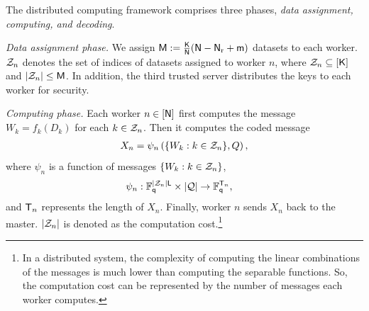 \documentclass[conference,letterpaper]{IEEEtran}
\begin{document}
The distributed computing framework comprises three phases, {\it data assignment, computing, and decoding}. 

{\it Data assignment phase.}
We assign ${\sf M}:=\frac{{\sf K}}{{\sf N}} ({\sf N}-{\sf N}_{\rm r}+{\sf m})$ datasets to each worker. ${\cal Z}_n$ denotes the set of indices of datasets assigned to worker $n$, where ${\cal Z}_n \subseteq [{\sf K}]$ and $|{\cal Z}_n| \leq {\sf M}$. In addition, the third trusted server distributes the keys to each worker for security.

{\it Computing phase.}
Each worker $n \in[{\sf N}]$ first computes the message $W_k = f_k (D_k)$ for each $k \in {\cal Z}_n$. Then it computes the coded message 
\begin{align}
 X_n = \psi_n \left( \{W_k:  k \in {\cal Z}_n\},  Q \right),
 \end{align}
  where  $\psi_n$  is a  function of messages $\{W_k: k\in {\cal Z}_n\}$, 
\begin{align} 
\psi_n &:  \mathbb{F}_{{\sf q}}^{ |{\cal Z}_n| {\sf L}} \times   | {\cal Q} |  \to \mathbb{F}_{{\sf q}}^{ {\sf T}_n },  
\label{eq: encoding function def}
\end{align}
and ${\sf T}_n$ represents the length of $ X_n $. Finally, worker $n$ sends $X_n$ back to the master. $|{\cal Z}_n|$ is denoted as the computation cost.\footnote{\label{computation cost} In a distributed system, the complexity of computing the linear combinations of the messages is much lower than computing the separable functions. So, the computation cost can be represented by the number of messages each worker computes.}
\end{document}
